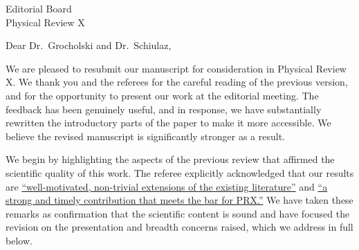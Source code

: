 \documentclass[11pt, letterpaper]{article}
\begin{document}
\noindent
Editorial Board\\
Physical Review X\\

\vspace{12pt}

\noindent
Dear Dr.\ Grocholski and Dr.\ Schiulaz,

We are pleased to resubmit our manuscript for consideration in Physical Review X. We thank you and the referees for the careful reading of the previous version, and for the opportunity to present our work at the editorial meeting. The feedback has been genuinely useful, and in response, we have substantially rewritten the introductory parts of the paper to make it more accessible. We believe the revised manuscript is significantly stronger as a result.

We begin by highlighting the aspects of the previous review that affirmed the scientific quality of this work. The referee explicitly acknowledged that our results are \ul{``well-motivated, non-trivial extensions of the existing literature''} and \ul{``a strong and timely contribution that meets the bar for PRX.''} We have taken these remarks as confirmation that the scientific content is sound and have focused the revision on the presentation and breadth concerns raised, which we address in full below. 
\end{document}
